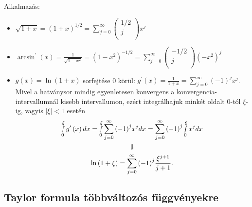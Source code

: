 \documentclass[12pt,a4paper]{scrartcl}
\providecommand{\tightlist}{%
  \setlength{\itemsep}{0pt}\setlength{\parskip}{0pt}}
\newenvironment{pelda}{}{}
\begin{document}
\begin{pelda}

Alkalmazás:

\begin{itemize}
\tightlist
\item
  \(\sqrt{1 + x} = \left( {1 + x} \right)^{1/2} = {\sum\limits_{j = 0}^{\infty}{\begin{pmatrix} {1/2} \\ j \\ \end{pmatrix}x^{j}}}\)
\item
  \(\arcsin^{\prime}\left( x \right) = \frac{1}{\sqrt{1 - x^{2}}} = \left( {1 - x^{2}} \right)^{- 1/2} = {\sum\limits_{j = 0}^{\infty}{\begin{pmatrix} {- 1/2} \\ j \\ \end{pmatrix}\left( {- x^{2}} \right)^{j}}}\)
\item
  \(g\left( x \right) = \ln\left( {1 + x} \right)\) sorfejtése 0 körül:
  \(g^{\prime}\left( x \right) = \frac{1}{1 + x} = {\sum\limits_{j = 0}^{\infty}{\left( {- 1} \right)^{j}x^{j}}}\).
  Mivel a hatványsor mindig egyenletesen konvergens a
  konvergencia-intervallumnál kisebb intervallumon, ezért integrálhajuk
  minkét oldalt 0-tól \(\xi\)-ig, vagyis \(\left| \xi \right| < 1\)
  esetén \[\begin{gathered}
    \mathop \smallint \limits_0^\xi  g'\left( x \right)dx = \mathop \smallint \limits_0^\xi  \mathop \sum \limits_{j = 0}^\infty  {\left( { - 1} \right)^j}{x^j}dx = \mathop \sum \limits_{j = 0}^\infty  {\left( { - 1} \right)^j}\mathop \smallint \limits_0^\xi  {x^j}dx \\ 
     \Downarrow  \\ 
    \ln \left( {1 + \xi } \right) = \mathop \sum \limits_{j = 0}^\infty  {\left( { - 1} \right)^j}\frac{{{\xi ^{j + 1}}}}{{j + 1}}. \\ 
  \end{gathered} \]
\end{itemize}

\end{pelda}

\hypertarget{taylor-formula-tobbvaltozos-fuggvenyekre}{%
\subsection{Taylor formula többváltozós
függvényekre}\label{taylor-formula-tobbvaltozos-fuggvenyekre}}
\end{document}
